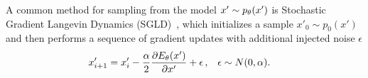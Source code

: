 \documentclass[tablecaption=bottom,wcp]{jmlr} %
\begin{document}
A common method for sampling from the model $x' \sim p_\theta(x')$  is Stochastic 
Gradient Langevin Dynamics (SGLD)~\cite{welling2011bayesian}, which initializes a sample $x'_0 \sim p_0(x')$ and then performs a sequence of gradient updates with additional injected noise $\epsilon$
\begin{align}
\label{eq:sgld}
x'_{i+1} &= x'_i - \frac{\alpha}{2} \frac{\partial E_\theta (x')}{\partial x'} + \epsilon
\,,&
\epsilon &\sim N(0, \alpha)
.
\end{align}


\end{document}
